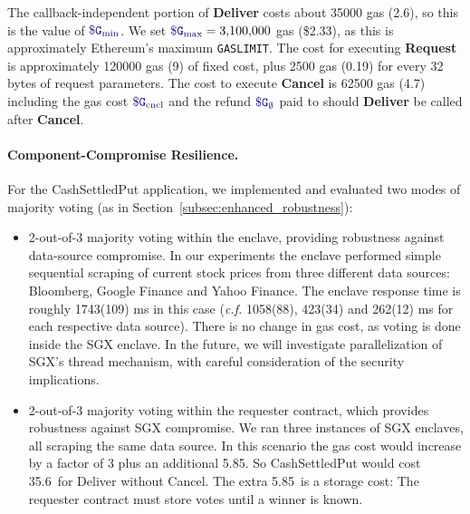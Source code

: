 The callback-independent portion of {\bf Deliver} costs about \num[group-separator={,}]{35000} gas (2.6\textcent), so this is the value of $\constgasmin$.
We set $\constgasmax = \num[group-separator={,}]{3100000}$ gas (\$2.33), as this is approximately Ethereum's maximum {\tt GASLIMIT}.
The cost for executing {\bf Request} is approximately \num[group-separator={,}]{120000} gas (9\textcent) of fixed cost, 
plus \num[group-separator={,}]{2500} gas (0.19\textcent) for every 32 bytes of request parameters.
The cost to execute {\bf Cancel} is 62500 gas (4.7\textcent)
including the gas cost $\constgasinvokecancel$ and the refund $\constgascancel$ paid to \tc should {\bf Deliver} be called after {\bf Cancel}.





\paragraph{Component-Compromise Resilience.}
\label{subsec:hedging}
For the {\sf CashSettledPut} application, 
we implemented and evaluated two modes of majority voting (as in Section~\ref{subsec:enhanced_robustness}):
\begin{itemize}[leftmargin=3mm]
  \setlength{\itemsep}{2pt}
  \setlength{\parskip}{0pt}
  \setlength{\parsep}{0pt}
\item
2-out-of-3 majority voting within the enclave, providing robustness
against data-source compromise. 
In our experiments
the enclave performed simple sequential scraping of current stock prices 
from three different data sources: Bloomberg, Google Finance and Yahoo Finance.
The enclave response time is roughly
1743(109) ms in this case ({\it c.f.}  
1058(88), 423(34) and 262(12) ms for 
each respective data source). There is no change in gas cost, as voting is done
inside the SGX enclave.
In the future, we will investigate parallelization of SGX's thread mechanism, with careful consideration of the security implications.


\item
2-out-of-3 majority voting within the requester contract,
which provides robustness against 
SGX compromise.
We ran three instances of SGX enclaves, all scraping
the same data source.  
In this scenario 
the gas cost would increase by a factor of 3 plus an additional 5.85\textcent.
So {\sf CashSettledPut} would cost 35.6\textcent\ for Deliver without Cancel.
The extra 5.85\textcent\ is a storage cost: The requester contract must store votes
until a winner is known.
\end{itemize}


